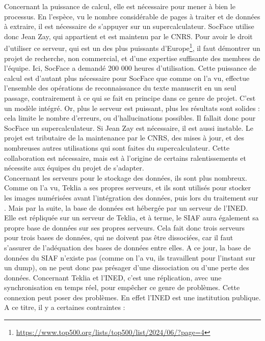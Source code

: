 Concernant la puissance de calcul, elle est nécessaire pour mener à bien le processus. En l’espèce, vu le nombre considérable de pages à traiter et de données à extraire, il est nécessaire de s’appuyer sur un supercalculateur. SocFace utilise donc Jean Zay, qui appartient et est maintenu par le CNRS. Pour avoir le droit d'utiliser ce serveur, qui est un des plus puissants d'Europe\footnote{\href{https://www.top500.org/lists/top500/list/2024/06/?page=4}{https://www.top500.org/lists/top500/list/2024/06/?page=4}}, il faut démontrer un projet de recherche, non commercial, et d'une expertise suffisante des membres de l'équipe. Ici, SocFace a demandé 200 000 heures d'utilisation.
Cette puissance de calcul est d’autant plus nécessaire pour SocFace que comme on l’a vu, \Arkindex{} effectue l’ensemble des opérations de reconnaissance du texte manuscrit en un seul passage, contrairement à ce qui se fait en principe dans ce genre de projet. C’est un modèle intégré. Or, plus le serveur est puissant, plus les résultats sont solides : cela limite le nombre d’erreurs, ou d’hallucinations possibles. Il fallait donc pour SocFace un supercalculateur. Si Jean Zay est nécessaire, il est aussi instable. Le projet est tributaire de la maintenance par le CNRS, des mises à jour, et des nombreuses autres utilisations qui sont faites du supercalculateur. Cette collaboration est nécessaire, mais est à l’origine de certains ralentissements et nécessite aux équipes du projet de s’adapter.\\
Concernant les serveurs pour le stockage des données, ils sont plus nombreux. Comme on l’a vu, Teklia a ses propres serveurs, et ils sont utilisés pour stocker les images numérisées avant l’intégration des données, puis lors du traitement sur \Arkindex{}. Mais par la suite, la base de données est hébergée par un serveur de l’INED. Elle est répliquée sur un serveur de Teklia, et à terme, le SIAF aura également sa propre base de données sur ses propres serveurs. Cela fait donc trois serveurs pour trois bases de données, qui ne doivent pas être dissociées, car il faut s’assurer de l’adéquation des bases de données entre elles. A ce jour, la base de données du SIAF n’existe pas (comme on l’a vu, ils travaillent pour l’instant sur un dump), on ne peut donc pas présager d’une dissociation ou d’une perte des données. Concernant Teklia et l’INED, c’est une réplication, avec une synchronisation en temps réel, pour empêcher ce genre de problèmes. Cette connexion peut poser des problèmes. En effet l’INED est une institution publique. 
\\A ce titre, il y a certaines contraintes : 

